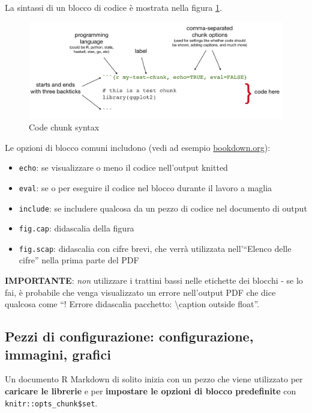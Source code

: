 \documentclass[a4paper, 11pt, nobind]{templates/ociamthesis}
\providecommand{\tightlist}{%
  \setlength{\itemsep}{0pt}\setlength{\parskip}{0pt}}
\begin{document}
La sintassi di un blocco di codice è mostrata nella figura \ref{fig:chunk-parts}.

\begin{figure}[H]
\includegraphics[width=1\linewidth]{figures/sample-content/chunk-parts} \caption{Code chunk syntax}\label{fig:chunk-parts}
\end{figure}

Le opzioni di blocco comuni includono (vedi ad esempio \href{https://bookdown.org/yihui/rmarkdown/r-code.html}{bookdown.org}):

\begin{itemize}
\tightlist
\item
  \texttt{echo}: se visualizzare o meno il codice nell'output knitted
\item
  \texttt{eval}: se o per eseguire il codice nel blocco durante il lavoro a maglia
\item
  \texttt{include}: se includere qualcosa da un pezzo di codice nel documento di output
\item
  \texttt{fig.cap}: didascalia della figura
\item
  \texttt{fig.scap}: didascalia con cifre brevi, che verrà utilizzata nell'``Elenco delle cifre'' nella prima parte del PDF
\end{itemize}

\textbf{IMPORTANTE}: \emph{non} utilizzare i trattini bassi nelle etichette dei blocchi - se lo fai, è probabile che venga visualizzato un errore nell'output PDF che dice qualcosa come ``! Errore didascalia pacchetto: \textbackslash caption outside float''.

\hypertarget{pezzi-di-configurazione-configurazione-immagini-grafici}{%
\subsection{Pezzi di configurazione: configurazione, immagini, grafici}\label{pezzi-di-configurazione-configurazione-immagini-grafici}}

Un documento R Markdown di solito inizia con un pezzo che viene utilizzato per \textbf{caricare le librerie} e per \textbf{impostare le opzioni di blocco predefinite} con \texttt{knitr::opts\_chunk\$set}.
\end{document}
